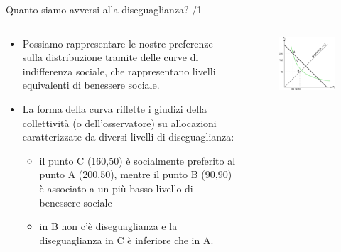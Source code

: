 \documentclass[aspectratio=64,12pt]{beamer}
\begin{document}
\begin{frame}{Quanto siamo avversi alla diseguaglianza? /1}
\begin{columns}
\begin{column}{.5\columnwidth}
\begin{resize}{.9}
\begin{itemize}
\item Possiamo rappresentare le nostre preferenze sulla distribuzione tramite
delle \alert{curve di indifferenza sociale}, che rappresentano livelli equivalenti
di benessere sociale.
\item La forma della curva riflette i giudizi della collettività (o
dell'osservatore) su allocazioni caratterizzate da diversi livelli di
diseguaglianza:
\begin{itemize}
\item il punto C (160,50) è socialmente preferito al punto A (200,50), mentre il
punto B (90,90) è associato a un più basso livello di benessere sociale
\item in B non c'è diseguaglianza e la diseguaglianza in C è inferiore che in A.
\end{itemize}
\end{itemize}
\end{resize}
\end{column}

\begin{column}{.5\columnwidth}
\begin{figure}[htbp]
\centering
\includegraphics[width=\textwidth]{./figure/fbs-color-0.pdf}
\end{figure}
\end{column}
\end{columns}
\end{frame}
\end{document}
